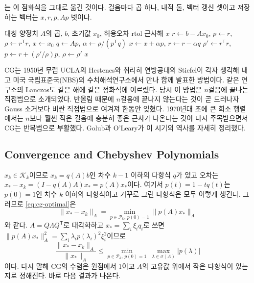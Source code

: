 는 이 점화식을 그대로 옮긴 것이다. 걸음마다 곱 하나, 내적 둘, 벡터 갱신 셋이고 저장하는 벡터는 $x,r,p,Ap$ 넷이다.

\begin{algorithm}[t]
\begin{algorithmic}[1]
\Require 대칭 양정치 $A$의 곱, $b$, 초기값 $x_0$, 허용오차 $\mathrm{rtol}$
\Ensure 근사해 $x$
\State $r\gets b-Ax_0$, $p\gets r$, $\rho\gets r^{\mathsf T}r$, $x\gets x_0$
  \State $q\gets Ap$, $\alpha\gets\rho/(p^{\mathsf T}q)$
  \State $x\gets x+\alpha p$, $r\gets r-\alpha q$ 
  \State $\rho'\gets r^{\mathsf T}r$, $p\gets r+(\rho'/\rho)p$, $\rho\gets\rho'$
\EndWhile
\State \Return $x$
\end{algorithmic}
\caption{켤레 기울기법}
\label{alg:cg}
\end{algorithm}

\begin{aside}
CG는 1950년 무렵 UCLA의 Hestenes와 취리히 연방공대의 Stiefel이 각자 생각해 내고 미국 국립표준국(NBS)의 수치해석연구소에서 만나 함께 발표한 방법이다\cite{hestenes1952}. 같은 연구소의 Lanczos도 같은 해에 같은 점화식에 이르렀다\cite{lanczos1952}. 당시 이 방법은 $n$걸음에 끝나는 직접법으로 소개되었다. 반올림 때문에 $n$걸음에 끝나지 않는다는 것이 곧 드러나자 Gauss 소거보다 비싼 직접법으로 여겨져 한동안 잊혔다. 1970년대 초에 큰 희소 행렬에서는 $n$보다 훨씬 적은 걸음에 충분히 좋은 근사가 나온다는 것이 다시 주목받으면서 CG는 반복법으로 부활했다. Golub과 O'Leary가 이 시기의 역사를 자세히 정리했다\cite{golub1989history}.
\end{aside}

\subsection{Convergence and Chebyshev Polynomials}

$x_k\in\mathcal K_k$이므로 $x_k=q(A)b$인 차수 $k-1$ 이하의 다항식 $q$가 있고 오차는 $x_\ast-x_k=(I-q(A)A)x_\ast=p(A)x_\ast$이다. 여기서 $p(t)=1-tq(t)$는 $p(0)=1$인 차수 $k$ 이하의 다항식이고 거꾸로 그런 다항식은 모두 이렇게 생긴다. 그러므로 \eqref{eq:cg-optimal}은
\[
\|x_\ast-x_k\|_A=\min_{p\in\mathcal P_k,\,p(0)=1}\|p(A)x_\ast\|_A
\]
와 같다. $A=Q\Lambda Q^{\mathsf T}$로 대각화하고 $x_\ast=\sum_i\xi_iq_i$로 쓰면 $\|p(A)x_\ast\|_A^2=\sum_i\lambda_ip(\lambda_i)^2\xi_i^2$이므로
\begin{equation}
\label{eq:cg-minmax}
\frac{\|x_\ast-x_k\|_A}{\|x_\ast\|_A}\le\min_{p\in\mathcal P_k,\,p(0)=1}\ \max_{\lambda\in\sigma(A)}|p(\lambda)|
\end{equation}
이다. 다시 말해 CG의 수렴은 원점에서 $1$이고 $A$의 고유값 위에서 작은 다항식이 있는지로 정해진다. 바로 다음 결과가 나온다.

